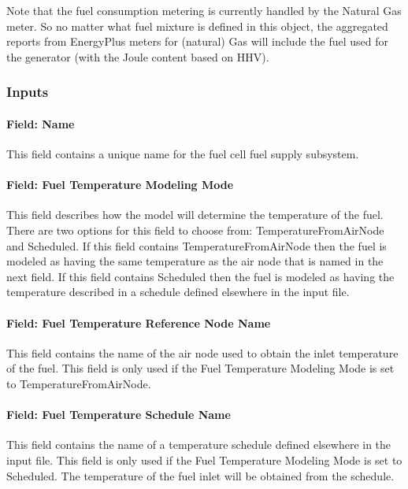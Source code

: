 Note that the fuel consumption metering is currently handled by the Natural Gas meter. So no matter what fuel mixture is defined in this object, the aggregated reports from EnergyPlus meters for (natural) Gas will include the fuel used for the generator (with the Joule content based on HHV).

\subsubsection{Inputs}\label{inputs-19-000}

\paragraph{Field: Name}\label{field-name-22}

This field contains a unique name for the fuel cell fuel supply subsystem.

\paragraph{Field: Fuel Temperature Modeling Mode}\label{field-fuel-temperature-modeling-mode}

This field describes how the model will determine the temperature of the fuel. There are two options for this field to choose from: TemperatureFromAirNode and Scheduled. If this field contains TemperatureFromAirNode then the fuel is modeled as having the same temperature as the air node that is named in the next field. If this field contains Scheduled then the fuel is modeled as having the temperature described in a schedule defined elsewhere in the input file.

\paragraph{Field: Fuel Temperature Reference Node Name}\label{field-fuel-temperature-reference-node-name}

This field contains the name of the air node used to obtain the inlet temperature of the fuel. This field is only used if the Fuel Temperature Modeling Mode is set to TemperatureFromAirNode.

\paragraph{Field: Fuel Temperature Schedule Name}\label{field-fuel-temperature-schedule-name}

This field contains the name of a temperature schedule defined elsewhere in the input file. This field is only used if the Fuel Temperature Modeling Mode is set to Scheduled. The temperature of the fuel inlet will be obtained from the schedule.

